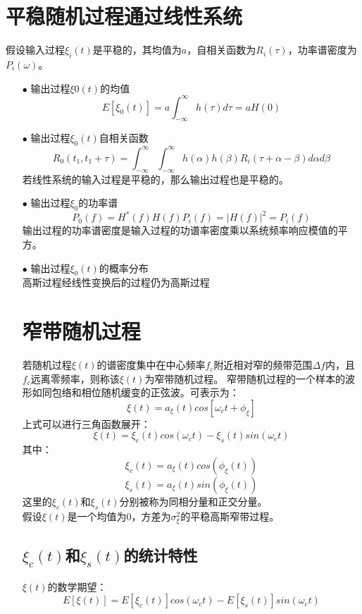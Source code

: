\documentclass[12pt,a4paper,oneside]{ctexart}
\begin{document}
\section{平稳随机过程通过线性系统}
假设输入过程$\xi_{i}(t)$是平稳的，其均值为$a$，自相关函数为$R_{i}(\tau)$，功率谱密度为$P_{i}(\omega)$。
\begin{itemize}
    \item[$\bullet$] 输出过程$\xi{0}(t)$的均值
    $$
        E\left[\xi_{0}(t)\right] = a\int_{-\infty}^{\infty}h(\tau)d\tau = aH(0)
    $$
    \item[$\bullet$] 输出过程$\xi_{0}(t)$自相关函数
    $$
        R_{0}(t_{1},t_{1} + \tau) = \int_{-\infty}^{\infty}\int_{-\infty}^{\infty}h(\alpha)h(\beta)R_{i}(\tau + \alpha - \beta)d\alpha d\beta
    $$ 
    若线性系统的输入过程是平稳的，那么输出过程也是平稳的。
    \item[$\bullet$] 输出过程$\xi_{0}$的功率谱
    $$
        P_{0}(f) = H^{*}(f)H(f)P_{i}(f) = |H(f)|^{2} = P_{i}(f)  
    $$
    输出过程的功率谱密度是输入过程的功谱率密度乘以系统频率响应模值的平方。
    \item[$\bullet$] 输出过程$\xi_{0}(t)$的概率分布\\
    高斯过程经线性变换后的过程仍为高斯过程 
\section{窄带随机过程}
若随机过程$\xi(t)$的谱密度集中在中心频率$f_{c}$附近相对窄的频带范围$\Delta f$内，且$f_{c}$远离零频率，则称该$\xi(t)$为窄带随机过程。
窄带随机过程的一个样本的波形如同包络和相位随机缓变的正弦波。可表示为：
$$
    \xi(t) = a_{\xi}(t)cos\left[\omega_{c}t + \phi_{\xi} \right]
$$
上式可以进行三角函数展开：
$$
    \xi(t) = \xi_{c}(t)cos(\omega_{c}t) - \xi_{s}(t)sin(\omega_{c}t)
$$
其中：
$$
    \xi_{c}(t) = a_{\xi}(t)cos(\phi_{\xi}(t))
$$
$$
    \xi_{s}(t) = a_{\xi}(t)sin(\phi_{\xi}(t))
$$
这里的$\xi_{c}(t)$和$\xi_{s}(t)$分别被称为同相分量和正交分量。\\
假设$\xi(t)$是一个均值为0，方差为$\sigma^{2}_{\xi}$的平稳高斯窄带过程。
\subsection{$\xi_{c}(t)$和$\xi_{s}(t)$的统计特性}
$\xi(t)$的数学期望：
$$
    E\left[\xi(t)\right] = E\left[\xi_{c}(t)\right]cos(\omega_{c}t) - E\left[\xi_{s}(t)\right]sin(\omega_{c}t)
$$
\end{itemize}
\end{document}

